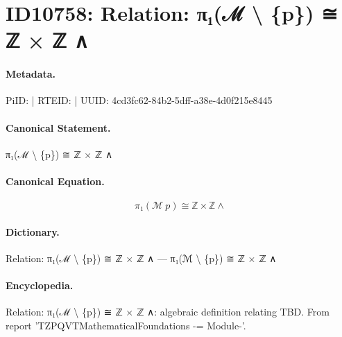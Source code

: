 \section*{ID10758: Relation: π₁(ℳ \textbackslash{} \{p\}) ≅ ℤ × ℤ ∧}
\paragraph{Metadata.}
PiID:  | RTEID:  | UUID: 4cd3fc62-84b2-5dff-a38e-4d0f215e8445

\paragraph{Canonical Statement.}
π₁(ℳ \textbackslash{} \{p\}) ≅ ℤ × ℤ ∧

\paragraph{Canonical Equation.}
\[
π₁(ℳ \ {p}) ≅ ℤ × ℤ ∧
\]

\paragraph{Dictionary.}
Relation: π₁(ℳ \textbackslash{} \{p\}) ≅ ℤ × ℤ ∧ — π₁(ℳ \textbackslash{} \{p\}) ≅ ℤ × ℤ ∧

\paragraph{Encyclopedia.}
Relation: π₁(ℳ \textbackslash{} \{p\}) ≅ ℤ × ℤ ∧: algebraic definition relating TBD. From report 'TZPQVTMathematicalFoundations -= Module-'.
